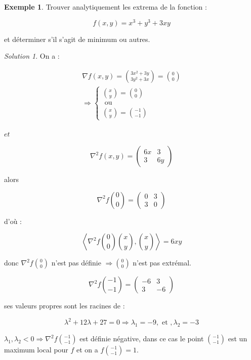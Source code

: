 \documentclass[a4paper,12pt,openany]{book}
\theoremstyle{plain}
\theoremstyle{definition}
\newtheorem{exemple}[theorem]{Exemple}
\theoremstyle{remark}
\newtheorem{solution}{Solution}[section]
\theoremstyle{nbstyle}
\begin{document}
	\begin{exemple} Trouver analytiquement les extrema de la fonction :
		
		$$
		f(x, y)=x^{3}+y^{3}+3 x y
		$$
		
		et déterminer s'il s'agit de minimum ou autres.
	\end{exemple}
	\begin{solution}
		On a :
		
		$$
		\begin{gathered}
		\nabla f(x, y)=\binom{3 x^{2}+3 y}{3 y^{2}+3 x}=\binom{0}{0} \\
		\Longrightarrow\left\{\begin{array}{c}
		\binom{x}{y}=\binom{0}{0} \\
		\text { ou } \\
		\binom{x}{y}=\binom{-1}{-1}
		\end{array}\right.
		\end{gathered}
		$$
		
		$e t$
		
		$$
		\nabla^{2} f(x, y)=\left(\begin{array}{cc}
		6 x & 3 \\
		3 & 6 y
		\end{array}\right)
		$$
		
		alors
		
		$$
		\nabla^{2} f\binom{0}{0}=\left(\begin{array}{ll}
		0 & 3 \\
		3 & 0
		\end{array}\right)
		$$
		
		d'où :
		
		$$
		\left\langle\nabla^{2} f\binom{0}{0}\binom{x}{y},\binom{x}{y}\right\rangle=6 x y
		$$
		
		donc $\nabla^{2} f\binom{0}{0}$ n'est pas définie $\Longrightarrow\binom{0}{0}$ n'est pas extrémal.
		
		$$
		\nabla^{2} f\binom{-1}{-1}=\left(\begin{array}{cc}
		-6 & 3 \\
		3 & -6
		\end{array}\right)
		$$
		
		ses valeurs propres sont les racines de :
		
		$$
		\lambda^{2}+12 \lambda+27=0 \Longrightarrow \lambda_{1}=-9, \text { et }, \lambda_{2}=-3
		$$
		
		$\lambda_{1}, \lambda_{2}<0 \Longrightarrow \nabla^{2} f\binom{-1}{-1}$ est définie négative, dans ce cas le point $\binom{-1}{-1}$ est un maximum local pour $f$ et on a $f\binom{-1}{-1}=1$.
	\end{solution}
	
\end{document}
